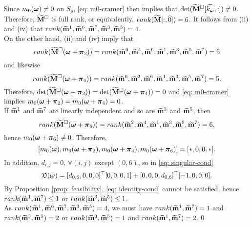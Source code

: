 Since $m_0(\V{\omega})\neq 0$ on $S_\rho$, \eqref{eq: m0-cramer} then implies that $\det(\Msub[\widehat{k_{\V{\omega}}},:])\neq 0$. Therefore, $\Msub$ is full rank, or equivalently, $rank(\M[:,\widehat{0}]) = 6$. It follows from  (ii) and (iv) that $rank(\mrow{1},\mrow{6},\mrow{7},\mrow{3},\mrow{5})= 4$.\\
On the other hand, (ii) and (iv) imply that $$rank(\Msub(\V{\omega}+\V{\pi}_2))=rank(\mrow{0},\mrow{4},\mrow{6},\mrow{1},\mrow{3},\mrow{5},\mrow{7})= 5$$ and likewise $$rank(\Msub(\V{\omega}+\V{\pi}_4))=rank(\mrow{0},\mrow{2},\mrow{6},\mrow{1},\mrow{3},\mrow{5},\mrow{7})= 5.$$ Therefore, $\det(\Msub(\V{\omega} + \V{\pi}_2)) = \det(\Msub(\V{\omega} + \V{\pi}_4)) = 0$ and \eqref{eq: m0-cramer} implies $m_0(\V{\omega}+\V{\pi}_2) = m_0(\V{\omega}+\V{\pi}_4) = 0$.\\
If $\mrow{1}$ and $\mrow{7}$ are linearly independent and so are $\mrow{3}$ and $\mrow{5}$, then $$rank(\Msub(\V{\omega}+\V{\pi}_6))=rank(\mrow{2},\mrow{4},\mrow{1},\mrow{3},\mrow{5},\mrow{7}) = 6,$$ hence $m_0(\V{\omega}+\V{\pi}_6)\neq 0$. Therefore, $$[m_0(\V{\omega}),m_0(\V{\omega}+\V{\pi}_2),m_0(\V{\omega}+\V{\pi}_4),m_0(\V{\omega}+\V{\pi}_6)] = [*,0,0,*].$$ In addition, $d_{i,j} = 0,\, \forall(i,j)$ except $(0,6)$, so in \eqref{eq: singular-cond} $$\mathfrak{D}(\V{\omega}) = [d_{0,6}, 0, 0,0]^\top [0,0,0,1] + [0,0,0,d_{0,6}]^\top [-1,0,0,0].$$  By Proposition \ref{prop: feasibility}, \eqref{eq: identity-cond} cannot be satisfied, hence $rank(\mrow{1},\mrow{7})\leq 1$ or $rank(\mrow{3},\mrow{5})\leq 1$.\\
As $rank(\mrow{1},\mrow{6},\mrow{7},\mrow{3},\mrow{5}) = 4$, we must have $rank(\mrow{1},\mrow{7}) = 1$ and $rank(\mrow{3},\mrow{5}) = 2$ or $rank(\mrow{3},\mrow{5}) = 1$ and $rank(\mrow{1},\mrow{7}) = 2$.\qed

